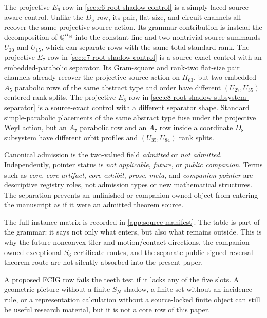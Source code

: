 The projective \(E_6\) row in \cref{sec:e6-root-shadow-control} is a simply laced source-aware control.  Unlike the \(D_5\) row, its pair, flat-size, and circuit channels all recover the same projective source action.  Its grammar contribution is instead the decomposition of \(\mathbb Q^{\Pi_{36}}\) into the constant line and two nontrivial source summands \(U_{20}\) and \(U_{15}\), which can separate rows with the same total standard rank.
The projective \(E_7\) row in \cref{sec:e7-root-shadow-control} is a source-exact control with an embedded-parabolic separator.  Its Gram-square and rank-two flat-size pair channels already recover the projective source action on \(\Pi_{63}\), but two embedded \(A_5\) parabolic rows of the same abstract type and order have different \((U_{27},U_{35})\) centered rank splits.
The projective \(E_8\) row in \cref{sec:e8-root-shadow-subsystem-separator} is a source-exact control with a different separator shape.  Standard simple-parabolic placements of the same abstract type fuse under the projective Weyl action, but an \(A_7\) parabolic row and an \(A_7\) row inside a coordinate \(D_8\) subsystem have different orbit profiles and \((U_{35},U_{84})\) rank splits.
\begin{definition}
Canonical admission is the two-valued field \emph{admitted} or
\emph{not admitted}.  Independently, pointer status is \emph{not applicable},
\emph{future}, or \emph{public companion}.  Terms such as \emph{core},
\emph{core artifact}, \emph{core exhibit}, \emph{prose}, \emph{meta}, and
\emph{companion pointer} are descriptive registry roles, not admission types
or new mathematical structures.  The separation prevents an unfinished or
companion-owned object from entering the manuscript as if it were an admitted
theorem source.
\end{definition}

The full instance matrix is recorded in \cref{app:source-manifest}.  The table is part of the grammar: it says not only what enters, but also what remains outside.  This is why the future nonconvex-tiler and motion/contact directions, the companion-owned exceptional \(S_6\) certificate routes, and the separate public signed-reversal theorem route are not silently absorbed into the present paper.

\begin{remark}
A proposed FCIG row fails the teeth test if it lacks any of the five slots.  A geometric picture without a finite \(S_N\) shadow, a finite set without an incidence rule, or a representation calculation without a source-locked finite object can still be useful research material, but it is not a core row of this paper.
\end{remark}

